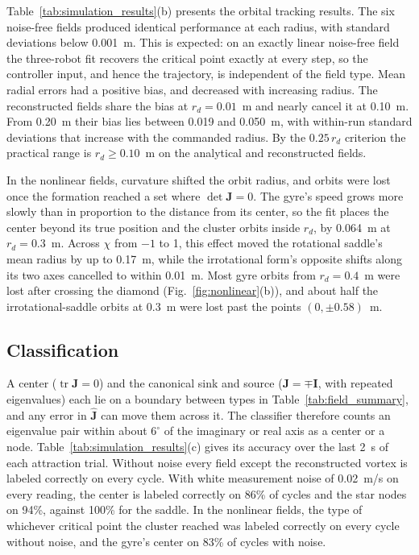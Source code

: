 \documentclass[lettersize,journal]{IEEEtran}
\newcommand{\rev}[1]{#1}
\begin{document}
    Table~\ref{tab:simulation_results}(b) presents the orbital tracking results. The six noise-free fields produced identical performance at each radius, with standard deviations below \rev{0.001}~m. This is expected: on an exactly linear noise-free field the three-robot fit recovers the critical point exactly at every step, so the controller input, and hence the trajectory, is independent of the field type. Mean radial errors had a positive bias, and decreased with increasing radius. The reconstructed fields share the bias at $r_d = 0.01$~m and nearly cancel it at 0.10~m. From 0.20~m their bias lies between \rev{0.019} and \rev{0.050}~m, with within-run standard deviations that increase with the commanded radius. By the $0.25\,r_d$ criterion the practical range is $r_d \ge \rev{0.10}$~m on the analytical and reconstructed fields.

In the nonlinear fields, curvature shifted the orbit radius, and orbits were lost once the formation reached a set where $\det\mathbf{J} = 0$. The gyre's speed grows more slowly than in proportion to the distance from its center, so the fit places the center beyond its true position and the cluster orbits inside $r_d$, by \rev{0.064}~m at $r_d = 0.3$~m. Across $\chi$ from $-1$ to 1, this effect moved the rotational saddle's mean radius by up to \rev{0.17}~m, while the irrotational form's opposite shifts along its two axes cancelled to within \rev{0.01}~m. Most gyre orbits from $r_d = 0.4$~m were lost after crossing the diamond (Fig.~\ref{fig:nonlinear}(b)), and about half the irrotational-saddle orbits at 0.3~m were lost past the points $(0, \pm 0.58)$~m.

\subsection{Classification}

A center ($\operatorname{tr}\mathbf{J} = 0$) and the canonical sink and source ($\mathbf{J} = \mp\mathbf{I}$, with repeated eigenvalues) each lie on a boundary between types in Table~\ref{tab:field_summary}, and any error in $\hat{\mathbf{J}}$ can move them across it. The classifier therefore counts an eigenvalue pair within about $6^\circ$ of the imaginary or real axis as a center or a node. Table~\ref{tab:simulation_results}(c) gives its accuracy over the last 2~s of each attraction trial. Without noise every field except the reconstructed vortex is labeled correctly on every cycle. With white measurement noise of 0.02~m/s on every reading, the center is labeled correctly on \rev{86}\% of cycles and the star nodes on \rev{94}\%, against \rev{100}\% for the saddle. In the nonlinear fields, the type of whichever critical point the cluster reached was labeled correctly on every cycle without noise, and the gyre's center on \rev{83}\% of cycles with noise.
\end{document}

